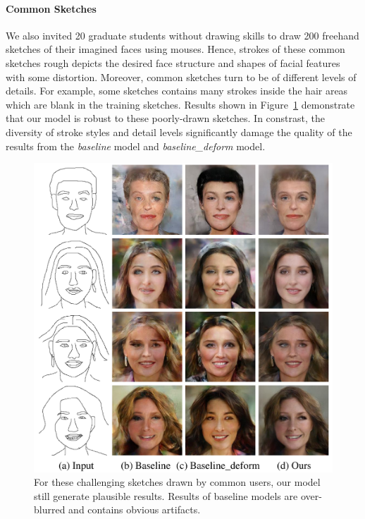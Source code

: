 \paragraph{Common Sketches}
We also invited 20 graduate students without drawing skills to draw 200 freehand sketches of their imagined faces using mouses. Hence, strokes of these common sketches rough depicts the desired face structure and shapes of facial features with some distortion. 
Moreover, common sketches turn to be of different levels of details. For example, some sketches contains many strokes inside the hair areas which are blank in the training sketches. 
%
Results shown in Figure~\ref{fig:common_sketches} demonstrate that our model is robust to these poorly-drawn sketches. 
In constrast, the diversity of stroke styles and detail levels significantly damage the quality of the results from the \textit{baseline} model and \textit{baseline\_deform} model.


\begin{figure}
	\includegraphics[width=0.9\linewidth]{figs/commonsketches}
	\caption{For these challenging sketches drawn by common users, our model still generate plausible results. Results of baseline models are over-blurred and contains obvious artifacts.}
	\label{fig:common_sketches}
\end{figure}

